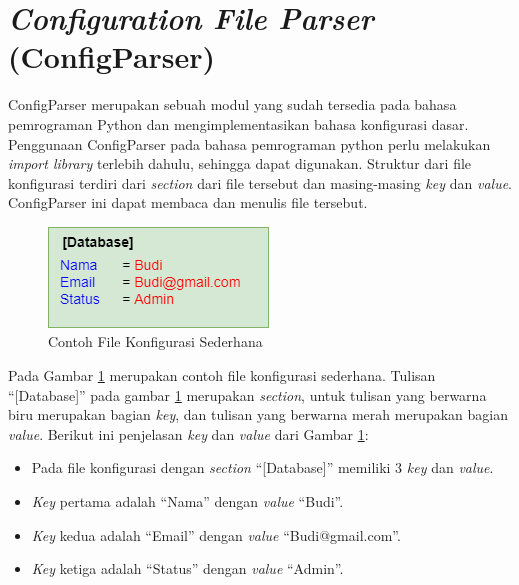 \section{\textit{Configuration File Parser} (ConfigParser)}
ConfigParser merupakan sebuah modul yang sudah tersedia pada bahasa pemrograman Python dan mengimplementasikan bahasa konfigurasi dasar\cite{parser}. Penggunaan ConfigParser pada bahasa pemrograman python perlu melakukan \textit{import library} terlebih dahulu, sehingga dapat digunakan. Struktur dari file konfigurasi terdiri dari \textit{section} dari file tersebut dan masing-masing \textit{key} dan \textit{value}. ConfigParser ini dapat membaca dan menulis file tersebut. 
\begin{figure}[H]
	\centering
	\includegraphics[scale=0.7]{Gambar/config.png}
	\caption{Contoh File Konfigurasi Sederhana} 
	\label{fig:config}
\end{figure}
Pada Gambar \ref{fig:config} merupakan contoh file konfigurasi sederhana. Tulisan ``[Database]'' pada gambar \ref{fig:config} merupakan \textit{section}, untuk tulisan yang berwarna biru merupakan bagian \textit{key}, dan tulisan yang berwarna merah merupakan bagian \textit{value}. Berikut ini penjelasan \textit{key} dan \textit{value} dari Gambar \ref{fig:config}:
\begin{itemize}
	\item Pada file konfigurasi dengan \textit{section} ``[Database]'' memiliki 3 \textit{key} dan \textit{value}.
	\item \textit{Key} pertama adalah ``Nama'' dengan \textit{value} ``Budi''.
	\item \textit{Key} kedua adalah ``Email'' dengan \textit{value} ``Budi@gmail.com''.
	\item \textit{Key} ketiga adalah ``Status'' dengan \textit{value} ``Admin''.
\end{itemize}

